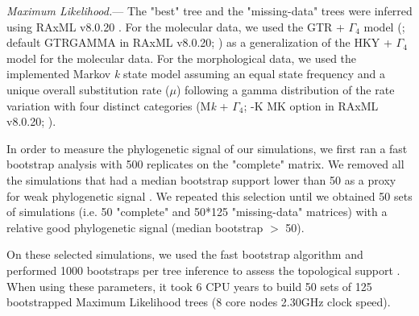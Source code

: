 \documentclass[12pt,letterpaper]{article}
\renewcommand{\subsubsection}[1]{%
\vspace{2ex}
\noindent
\textit{#1.}---}
\begin{document}
\subsubsection{Maximum Likelihood}
The "best" tree and the "missing-data" trees were inferred using RAxML v8.0.20 \citep{Stamatakis21012014}. For the molecular data, we used the GTR + $\Gamma_4$ model (\citealt{tavare1986}; default GTRGAMMA in RAxML v8.0.20; \citealt{Stamatakis21012014}) as a generalization of the HKY + $\Gamma_4$ model \citep{HKY85} for the molecular data.
For the morphological data, we used the implemented Markov \textit{k} state model \citep{lewisa2001} %
 assuming an equal state frequency and a unique overall substitution rate ($\mu$) following a gamma distribution of the rate variation with four distinct categories (M\textit{k} + $\Gamma_4$; -K MK option in RAxML v8.0.20; \citealt{Stamatakis21012014}).

In order to measure the phylogenetic signal of our simulations, we first ran a fast bootstrap analysis with 500 replicates on the "complete" matrix. We removed all the simulations that had a median bootstrap support lower than 50 as a proxy for weak phylogenetic signal \citep{zanderminimal2004}. We repeated this selection until we obtained 50 sets of simulations (i.e. 50 "complete" and 50*125 "missing-data" matrices) with a relative good phylogenetic signal (median bootstrap $>$ 50).

On these selected simulations, we used the fast bootstrap algorithm and performed 1000 bootstraps per tree inference to assess the topological support \citep{pattengale2010many}.
When using these parameters, it took 6 CPU years to build 50 sets of 125 bootstrapped Maximum Likelihood trees (8 core nodes 2.30GHz clock speed).
\end{document}
